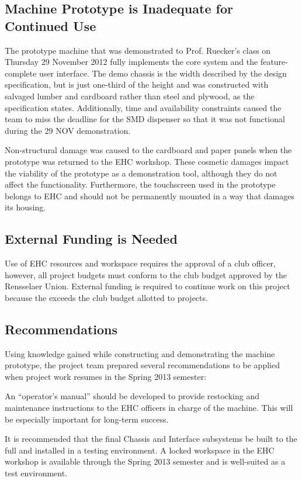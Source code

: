 \documentclass[12pt,oneside,final]{article}
\begin{document}
\subsection{Machine Prototype is Inadequate for Continued Use}
The prototype machine that was demonstrated to Prof. Ruecker's class on Thursday 29 November 2012 fully implements the core system and the feature-complete user interface. The demo chassis is the width described by the design specification, but is just one-third of the height and was constructed with salvaged lumber and cardboard rather than steel and plywood, as the specification states. Additionally, time and availability constraints caused the team to miss the deadline for the SMD dispenser so that it was not functional during the 29 NOV demonstration.

Non-structural damage was caused to the cardboard and paper panels when the prototype was returned to the EHC workshop. These cosmetic damages impact the viability of the prototype as a demonstration tool, although they do not affect the functionality. Furthermore, the touchscreen used in the prototype belongs to EHC and should not be permanently mounted in a way that damages its housing.

\subsection{External Funding is Needed}
Use of EHC resources and workspace requires the approval of a club officer, however, all project budgets must conform to the club budget approved by the Rensselaer Union. External funding is required to continue work on this project because the  exceeds the club budget allotted to projects.

\subsection{Recommendations}
Using knowledge gained while constructing and demonstrating the machine prototype, the project team prepared several recommendations to be applied when project work resumes in the Spring 2013 semester:

An ``operator's manual'' should be developed to provide restocking and maintenance instructions to the EHC officers in charge of the machine. This will be especially important for long-term success.

It is recommended that the final Chassis and Interface subsystems be built to the full  and installed in a testing environment. A locked workspace in the EHC workshop is available through the Spring 2013 semester and is well-suited as a test environment.
\end{document}
